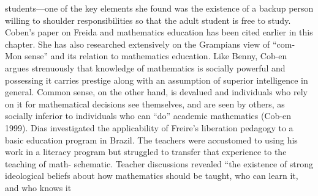 \documentclass{article}
\begin{document}
 students—one of the key elements she found was the existence of a backup person
 willing to shoulder responsibilities so that the adult student is free to study.
 Coben’s paper on Freida and mathematics education has been cited earlier in
 this chapter. She has also researched extensively on the Grampians view of “com-
   Mon sense” and its relation to mathematics education. Like Benny, Cob-en argues
 strenuously that knowledge of mathematics is socially powerful and possessing
 it carries prestige along with an assumption of superior intelligence in general.
 Common sense, on the other hand, is devalued and individuals who rely on it for
 mathematical decisions see themselves, and are seen by others, as socially inferior
 to individuals who can “do” academic mathematics (Cob-en 1999).
 Dias investigated the applicability of Freire’s liberation pedagogy to a basic
 education program in Brazil. The teachers were accustomed to using his work in a
 literacy program but struggled to transfer that experience to the teaching of math-
   schematic. Teacher discussions revealed “the existence of strong ideological beliefs
 about how mathematics should be taught, who can learn it, and who knows it
\end{document}
